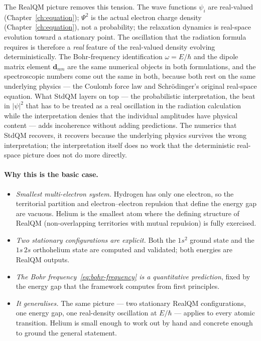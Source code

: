 The RealQM picture removes this tension. The wave functions $\psi_i$ are real-valued (Chapter~\ref{ch:equation}); $\Psi^2$ is the actual electron charge density (Chapter~\ref{ch:equation}), not a probability; the relaxation dynamics is real-space evolution toward a stationary point. The oscillation that the radiation formula requires is therefore a \emph{real} feature of the real-valued density evolving deterministically. The Bohr-frequency identification $\omega = E/\hbar$ and the dipole matrix element $\mathbf{d}_{nm}$ are the same numerical objects in both formulations, and the spectroscopic numbers come out the same in both, because both rest on the same underlying physics --- the Coulomb force law and Schr\"odinger's original real-space equation. What StdQM layers on top --- the probabilistic interpretation, the beat in $|\psi|^2$ that has to be treated as a real oscillation in the radiation calculation while the interpretation denies that the individual amplitudes have physical content --- adds incoherence without adding predictions. The numerics that StdQM recovers, it recovers because the underlying physics survives the wrong interpretation; the interpretation itself does no work that the deterministic real-space picture does not do more directly.

\paragraph{Why this is the basic case.}
\begin{itemize}
\item \emph{Smallest multi-electron system.} Hydrogen has only one electron, so the territorial partition and electron--electron repulsion that define the energy gap are vacuous. Helium is the smallest atom where the defining structure of RealQM (non-overlapping territories with mutual repulsion) is fully exercised.
\item \emph{Two stationary configurations are explicit.} Both the $1s^2$ ground state and the $1s\,2s$ orthohelium state are computed and validated; both energies are RealQM outputs.
\item \emph{The Bohr frequency~\eqref{eq:bohr-frequency} is a quantitative prediction}, fixed by the energy gap that the framework computes from first principles.
\item \emph{It generalises.} The same picture --- two stationary RealQM configurations, one energy gap, one real-density oscillation at $E / \hbar$ --- applies to every atomic transition. Helium is small enough to work out by hand and concrete enough to ground the general statement.
\end{itemize}

